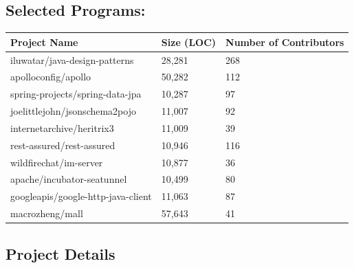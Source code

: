 \documentclass[conference]{IEEEtran}
\begin{document}
	\subsection{Selected Programs:}
            \begin{center}
            \begin{tabular}{|p{4cm}|p{2.0cm}|p{2.0cm}|}
            \hline
            \textbf{Project Name} & \textbf{Size (LOC)} & \textbf{Number of Contributors} \\
            \hline
            iluwatar/java-design-patterns & 28,281 & 268 \\
            \hline
            apolloconfig/apollo & 50,282 & 112 \\
            \hline
            spring-projects/spring-data-jpa & 10,287 & 97 \\
            \hline
            joelittlejohn/jsonschema2pojo & 11,007 & 92 \\
            \hline
            internetarchive/heritrix3 & 11,009 & 39 \\
            \hline
            rest-assured/rest-assured & 10,946 & 116 \\
            \hline
            wildfirechat/im-server & 10,877 & 36 \\
            \hline
            apache/incubator-seatunnel & 10,499 & 80 \\
            \hline
            googleapis/google-http-java-client & 11,063 & 87 \\
            \hline
            macrozheng/mall & 57,643 & 41 \\
            \hline
            \end{tabular}
            \label{table:selected-programs}
            \end{center}
        \subsection{Project Details}
\end{document}
